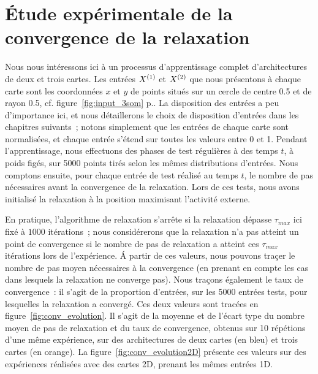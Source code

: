 \documentclass[../main]{subfiles}
\begin{document}
\section{\'Etude expérimentale de la convergence de la relaxation}\label{sec:relax_conv}

Nous nous intéressons ici à un processus d'apprentissage complet d'architectures de deux et trois cartes. 
Les entrées $X^{({1})}$ et $X^{({2})}$ que nous présentons à chaque carte sont les coordonnées $x$ et $y$ de points situés sur un cercle de centre 0.5 et de rayon 0.5, cf. figure~\ref{fig:input_3som} p.\pageref{fig:input_3som}. La disposition des entrées a peu d'importance ici, et nous détaillerons le choix de disposition d'entrées dans les chapitres suivants~; notons simplement que les entrées de chaque carte sont normalisées, et chaque entrée s'étend sur toutes les valeurs entre 0 et 1.
Pendant l'apprentissage, nous effectuons des phases de test régulières à des temps $t$, à poids figés, sur 5000 points tirés selon les mêmes distributions d'entrées. 
Nous comptons ensuite, pour chaque entrée de test réalisé au temps $t$, le nombre de pas nécessaires avant la convergence de la relaxation. Lors de ces tests, nous avons initialisé la relaxation à la position maximisant l'activité externe.

En pratique, l'algorithme de relaxation s'arrête si la relaxation dépasse $\tau_{max}$ ici fixé à $1000$ itérations~; nous considérerons que la relaxation n'a pas atteint un point de convergence si le nombre de pas de relaxation a atteint ces $\tau_{max}$ itérations lors de l'expérience.
\'A partir de ces valeurs, nous pouvons traçer le nombre de pas moyen nécessaires à la convergence (en prenant en compte les cas dans lesquels la relaxation ne converge pas).
Nous traçons également le taux de convergence~: il s'agit de la proportion d'entrées, sur les 5000 entrées tests, pour lesquelles la relaxation a convergé.
Ces deux valeurs sont tracées en figure~\ref{fig:conv_evolution}. Il s'agit de la moyenne et de l'écart type du nombre moyen de pas de relaxation et du taux de convergence, obtenus sur 10 répétions d'une même expérience, sur des architectures de deux cartes (en bleu) et trois cartes (en orange).
La figure~\ref{fig:conv_evolution2D} présente ces valeurs sur des expériences réalisées avec des cartes 2D, prenant les mêmes entrées 1D.
\end{document}
